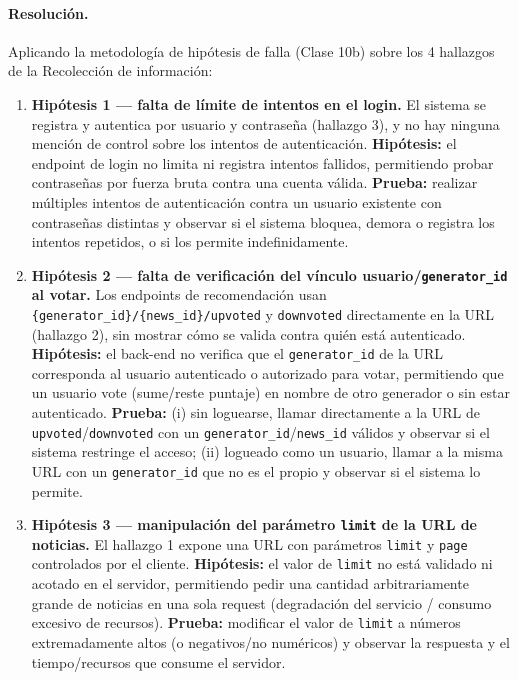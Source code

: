 \paragraph{Resolución.}
Aplicando la metodología de hipótesis de falla (Clase 10b) sobre los 4 hallazgos de la
Recolección de información:

\begin{enumerate}
  \item \textbf{Hipótesis 1 --- falta de límite de intentos en el login.} El sistema se
  registra y autentica por usuario y contraseña (hallazgo 3), y no hay ninguna mención de
  control sobre los intentos de autenticación. \textbf{Hipótesis:} el endpoint de login no
  limita ni registra intentos fallidos, permitiendo probar contraseñas por fuerza bruta contra
  una cuenta válida. \textbf{Prueba:} realizar múltiples intentos de autenticación contra un
  usuario existente con contraseñas distintas y observar si el sistema bloquea, demora o
  registra los intentos repetidos, o si los permite indefinidamente.

  \item \textbf{Hipótesis 2 --- falta de verificación del vínculo usuario/\texttt{generator\_id}
  al votar.} Los endpoints de recomendación usan \texttt{\{generator\_id\}/\{news\_id\}/upvoted}
  y \texttt{downvoted} directamente en la URL (hallazgo 2), sin mostrar cómo se valida contra
  quién está autenticado. \textbf{Hipótesis:} el back-end no verifica que el
  \texttt{generator\_id} de la URL corresponda al usuario autenticado o autorizado para votar,
  permitiendo que un usuario vote (sume/reste puntaje) en nombre de otro generador o sin estar
  autenticado. \textbf{Prueba:} (i) sin loguearse, llamar directamente a la URL de
  \texttt{upvoted}/\texttt{downvoted} con un \texttt{generator\_id}/\texttt{news\_id} válidos y
  observar si el sistema restringe el acceso; (ii) logueado como un usuario, llamar a la misma
  URL con un \texttt{generator\_id} que no es el propio y observar si el sistema lo permite.

  \item \textbf{Hipótesis 3 --- manipulación del parámetro \texttt{limit} de la URL de
  noticias.} El hallazgo 1 expone una URL con parámetros \texttt{limit} y \texttt{page}
  controlados por el cliente. \textbf{Hipótesis:} el valor de \texttt{limit} no está validado
  ni acotado en el servidor, permitiendo pedir una cantidad arbitrariamente grande de noticias
  en una sola request (degradación del servicio / consumo excesivo de recursos).
  \textbf{Prueba:} modificar el valor de \texttt{limit} a números extremadamente altos (o
  negativos/no numéricos) y observar la respuesta y el tiempo/recursos que consume el
  servidor.


\end{enumerate}
